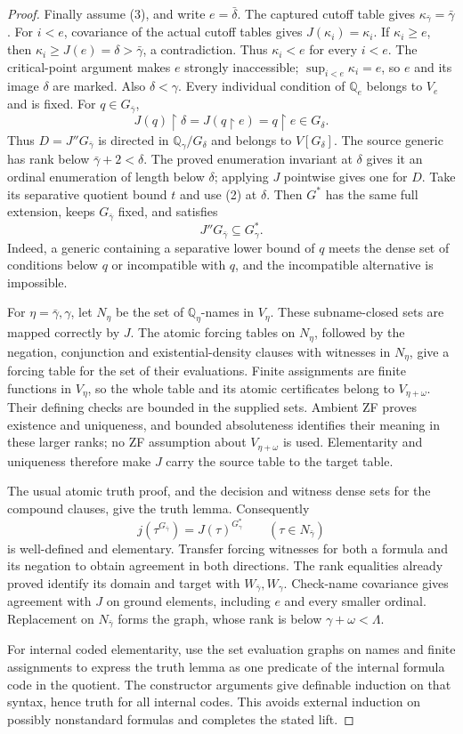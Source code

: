 \documentclass[11pt,a4paper]{amsart}
\newcommand{\restr}{\mathbin{\upharpoonright}}
\theoremstyle{plain}
\theoremstyle{definition}
\theoremstyle{remark}
\begin{document}
\begin{proof}
Finally assume (3), and write $e=\bar\delta$.
The captured cutoff table gives
$\kappa_{\bar\gamma}=\bar\gamma$.
For $i<e$, covariance of the actual cutoff tables gives
$J(\kappa_i)=\kappa_i$.  If $\kappa_i\geq e$, then
$\kappa_i\geq J(e)=\delta>\bar\gamma$, a contradiction.
Thus $\kappa_i<e$ for every $i<e$.
The critical-point argument makes $e$ strongly inaccessible;
$\sup_{i<e}\kappa_i=e$, so $e$ and its image $\delta$ are marked.
Also $\delta<\gamma$.
Every individual condition of $\mathbb Q_e$ belongs to $V_e$
and is fixed.  For $q\in G_{\bar\gamma}$,
\[
J(q)\restr\delta=J(q\restr e)=q\restr e\in G_\delta.
\]
Thus $D=J''G_{\bar\gamma}$ is directed in
$\mathbb Q_\gamma/G_\delta$ and belongs to $V[G_\delta]$.
The source generic has rank below $\bar\gamma+2<\delta$.
The proved enumeration invariant at $\delta$ gives it an
ordinal enumeration of length below $\delta$; applying $J$
pointwise gives one for $D$.
Take its separative quotient bound $t$ and use (2) at $\delta$.
Then $G^*$ has the same full extension, keeps
$G_{\bar\gamma}$ fixed, and satisfies
\[
J''G_{\bar\gamma}\subseteq G_\gamma^* .
\]
Indeed, a generic containing a separative lower bound of $q$
meets the dense set of conditions below $q$ or incompatible
with $q$, and the incompatible alternative is impossible.

For $\eta=\bar\gamma,\gamma$, let
$N_\eta$ be the set of $\mathbb Q_\eta$-names in $V_\eta$.
These subname-closed sets are mapped correctly by $J$.
The atomic forcing tables on $N_\eta$, followed by the
negation, conjunction and existential-density clauses with
witnesses in $N_\eta$, give a forcing table for the set of
their evaluations.  Finite assignments are finite functions
in $V_\eta$, so the whole table and its atomic certificates
belong to $V_{\eta+\omega}$.  Their defining checks are bounded
in the supplied sets.  Ambient ZF proves existence and
uniqueness, and bounded absoluteness identifies their meaning
in these larger ranks; no ZF assumption about
$V_{\eta+\omega}$ is used.  Elementarity and uniqueness
therefore make $J$ carry the source table to the target table.

The usual atomic truth proof, and the decision and witness
dense sets for the compound clauses, give the truth lemma.
Consequently
\[
j(\tau^{G_{\bar\gamma}})
       =J(\tau)^{G_\gamma^*}\qquad(\tau\in N_{\bar\gamma})
\]
is well-defined and elementary.  Transfer forcing witnesses
for both a formula and its negation to obtain agreement in
both directions.  The rank equalities already proved
identify its domain and target with $W_{\bar\gamma},W_\gamma$.
Check-name covariance gives agreement with $J$ on ground
elements, including $e$ and every smaller ordinal.
Replacement on $N_{\bar\gamma}$ forms the graph, whose rank
is below $\gamma+\omega<\Lambda$.

For internal coded elementarity, use the set evaluation graphs
on names and finite assignments to express the truth lemma
as one predicate of the internal formula code in the quotient.
The constructor arguments give definable induction on that
syntax, hence truth for all internal codes.  This avoids
external induction on possibly nonstandard formulas and
completes the stated lift.
\end{proof}
\end{document}
